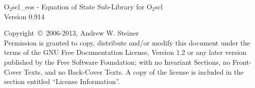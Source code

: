 \documentclass{article}
\begin{document}
\hypersetup{pageanchor=false,citecolor=blue}

\begin{titlepage}
\vspace*{7cm}
\begin{center}
{\huge O$_2$scl\_eos - Equation of State Sub-Library for O$_2$scl
\\[1ex]\large Version 0.914}\\
\end{center}
\vfill
Copyright~{\copyright}~2006-2013,
Andrew W. Steiner \\
Permission is granted to copy, distribute and/or modify this document
under the terms of the GNU Free Documentation License, Version 1.2 or
any later version published by the Free Software Foundation; with no
Invariant Sections, no Front-Cover Texts, and no Back-Cover Texts.  A
copy of the license is included in the section entitled ``License
Information''.
\end{titlepage}

\tableofcontents
{}
\hypersetup{pageanchor=true,citecolor=blue}
\end{document}
